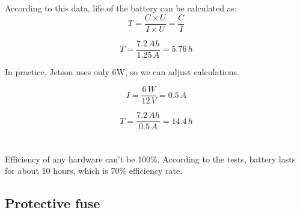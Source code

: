 \documentclass[]{IEEEphot}
\begin{document}
According to this data, life of the battery can be calculated as:
\begin{equation}
T = \frac{C \times U}{I \times U} = \frac{C}{I}
\end{equation}

\begin{equation}
T = \frac{7.2\,Ah}{1.25\,A} = 5.76\,h
\end{equation}

In practice, Jetson uses only 6W, so we can adjust calculations.

\begin{equation}
I = \frac{6\,W}{12\,V} = 0.5\,A
\end{equation}

\begin{equation}
T = \frac{7.2\,Ah}{0.5\,A} = 14.4\,h
\end{equation}
\\\\
Efficiency of any hardware can’t be 100\%. According to the tests, battery lasts for about 10 hours, which is 70\% efficiency rate.

\subsection{Protective fuse}
\end{document}
